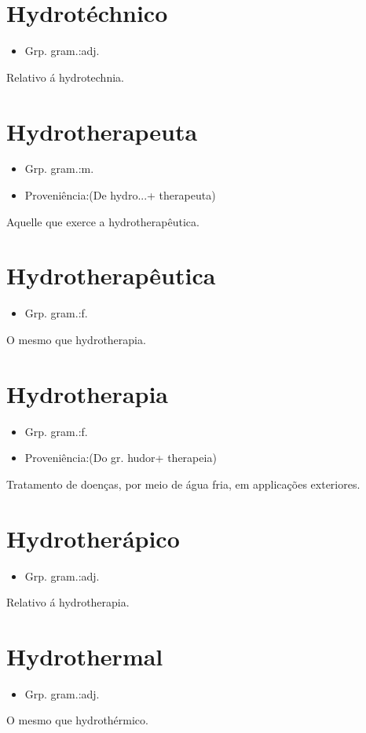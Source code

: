 \documentclass{article}
\begin{document}
\section{Hydrotéchnico}
\begin{itemize}
\item {Grp. gram.:adj.}
\end{itemize}
Relativo á hydrotechnia.
\section{Hydrotherapeuta}
\begin{itemize}
\item {Grp. gram.:m.}
\end{itemize}
\begin{itemize}
\item {Proveniência:(De \textunderscore hydro...\textunderscore  + \textunderscore therapeuta\textunderscore )}
\end{itemize}
Aquelle que exerce a hydrotherapêutica.
\section{Hydrotherapêutica}
\begin{itemize}
\item {Grp. gram.:f.}
\end{itemize}
O mesmo que \textunderscore hydrotherapia\textunderscore .
\section{Hydrotherapia}
\begin{itemize}
\item {Grp. gram.:f.}
\end{itemize}
\begin{itemize}
\item {Proveniência:(Do gr. \textunderscore hudor\textunderscore  + \textunderscore therapeia\textunderscore )}
\end{itemize}
Tratamento de doenças, por meio de água fria, em applicações exteriores.
\section{Hydrotherápico}
\begin{itemize}
\item {Grp. gram.:adj.}
\end{itemize}
Relativo á hydrotherapia.
\section{Hydrothermal}
\begin{itemize}
\item {Grp. gram.:adj.}
\end{itemize}
O mesmo que \textunderscore hydrothérmico\textunderscore .
\end{document}
